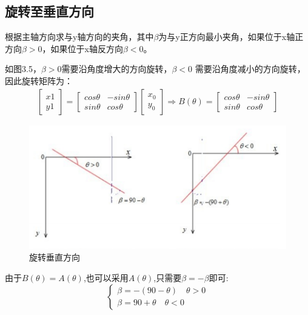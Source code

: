 \subsection{旋转至垂直方向}
根据主轴方向求与y轴方向的夹角，其中$\beta$为与y正方向最小夹角，如果位于x轴正方向$\beta>0$，如果位于x轴反方向$\beta<0$。
\par
如图3.5，$\beta>0$需要沿角度增大的方向旋转，$\beta<0$ 需要沿角度减小的方向旋转，因此旋转矩阵为：
\begin{equation}
\begin{aligned}
\left[
\begin{matrix}
x1\\
y1
\end{matrix}
\right]
=
\left[
\begin{matrix}
cos\theta & -sin\theta\\
sin\theta & cos\theta 
\end{matrix}
\right]
\left[
\begin{matrix}
x_0\\
y_0 
\end{matrix}
\right]
\Rightarrow
B(\theta)=
\left[
\begin{matrix}
cos\theta & -sin\theta\\
sin\theta & cos\theta 
\end{matrix}
\right] 
\end{aligned}
\end{equation}
\begin{figure}[h]
	\centering
	\includegraphics[scale=0.5]{figures/9.png}
	\caption{旋转垂直方向}
	\label{fig:2}
\end{figure}

由于$B(\theta)=A(\theta)$,也可以采用$A(\theta)$,只需要$\beta=-\beta$即可:
\begin{equation}
\left\{
\begin{array}{lr}
\beta=-(90-\theta) \quad \theta>0\\
\beta=90+\theta \quad \theta<0
\end{array}
\right.
\end{equation}

